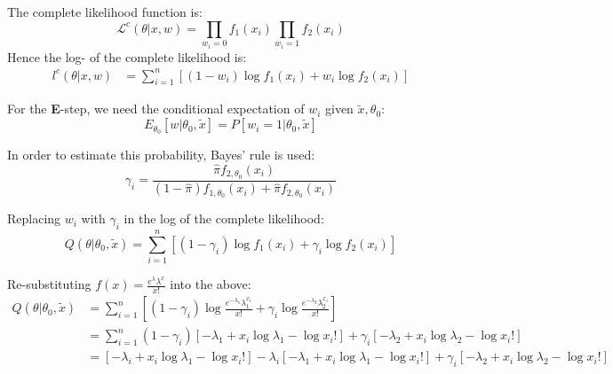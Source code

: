 \documentclass{article}
\begin{document}
\begin{enumerate}
\begin{enumerate}
                
                The complete likelihood function is:
                \begin{equation*}
                    \mathcal{L}^{c}(\theta|x,w) = \prod_{w_i = 0}f_1(x_i)\prod_{w_i=1}f_2(x_i)
                \end{equation*}
                Hence the log- of the complete likelihood is:
                \begin{equation*}
                    \begin{split}
                        l^{c}(\theta|x,w) &= \sum_{i=1}^{n}\left[(1-w_i)\log{f_1(x_i)} + w_i\log{f_2(x_i)}\right]
                    \end{split}
                \end{equation*}
                
                For the \textbf{E}-step, we need the conditional expectation of $w_i$ given $\tilde{x}, \theta_0$:
                \begin{equation*}                    E_{\theta_0}\left[w|\theta_0,\tilde{x}\right] = P\left[w_{i}=1|\theta_0, \tilde{x}\right]
                \end{equation*}
                
                In order to estimate this probability, Bayes' rule is used:
                \begin{equation*}
                    \gamma_i = \frac{\hat{\pi}f_{2, \theta_{0}}(x_i)}{(1-\hat{\pi})f_{1, \theta_{0}}(x_i) + \hat{\pi}f_{2, \theta_{0}}(x_i)}
                \end{equation*}
                
                Replacing $w_i$ with $\gamma_i$ in the log of the complete likelihood:
                \begin{equation*}
                    Q(\theta|\theta_0, \tilde{x}) = \sum_{i=1}^{n}\left[(1-\gamma_i)\log{f_1(x_i)} +\gamma_i\log{f_{2}(x_i)}\right]
                \end{equation*}
                
                Re-substituting $f(x) = \frac{e^{\lambda}\lambda^{x}}{x!}$ into the above:
                \begin{equation*}
                    \begin{split}
                        Q(\theta|\theta_0, \tilde{x}) &= \sum_{i=1}^{n}\left[(1-\gamma_i)\log{\frac{e^{-\lambda_1}\lambda_1^{x_{i}}}{x!}} +\gamma_i\log{\frac{e^{-\lambda_2}\lambda_2^{x_{i}}}{x!}}\right]\\
                        &= \sum_{i=1}^{n}(1-\gamma_i)\left[-\lambda_1 + x_i\log{\lambda_1} - \log{x_i!}\right] + \gamma_i\left[-\lambda_2 + x_i\log{\lambda_2} - \log{x_i!}\right]\\
                        &= \left[-\lambda_i + x_{i}\log{\lambda_1}-\log{x_i!}\right] - \lambda_{i}\left[-\lambda_1 + x_i\log{\lambda_1}-\log{x_i!}\right] + \gamma_i\left[-\lambda_2 + x_i\log{\lambda_2}-\log{x_i!}\right]
                    \end{split}
                \end{equation*}
                

\end{enumerate}
\end{enumerate}
\end{document}
